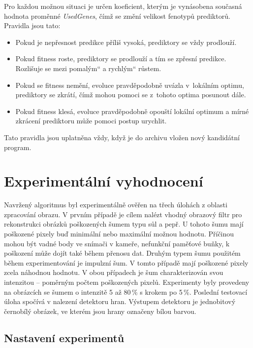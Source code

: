 \documentclass[fleqn,11pt]{ExcelAtFIT} %
\newcommand{\uv}[1]{\quotedblbase #1\textquotedblleft}
\begin{document}
Pro každou možnou situaci je určen koeficient, kterým je vynásobena současná hodnota proměnné \emph{UsedGenes}, čímž se změní velikost fenotypů prediktorů. Pravidla jsou tato:

\begin{itemize}
    \item Pokud je nepřesnost predikce příliš vysoká, prediktory se vždy prodlouží.
    \item Pokud fitness roste, prediktory se prodlouží a tím se zpřesní predikce. Rozlišuje se mezi \uv{pomalým} a \uv{rychlým} růstem.
    \item Pokud se fitness nemění, evoluce pravděpodobně uvázla v~lokálním optimu, prediktory se zkrátí, čímž mohou pomoci se z~tohoto optima posunout dále.
    \item Pokud fitness klesá, evoluce pravděpodobně opouští lokální optimum a mírné zkrácení prediktoru může pomoci postup urychlit.
\end{itemize}


Tato pravidla jsou uplatněna vždy, když je do archivu vložen nový kandidátní program.


\section{Experimentální vyhodnocení}
\label{sec:Experimental}

Navržený algoritmus byl experimentálně ověřen na třech úlohách z oblasti zpracování obrazu. V prvním případě je cílem nalézt vhodný obrazový filtr pro rekonstrukci obrázků poškozených šumem typu sůl a pepř. U tohoto šumu mají poškozené pixely buď minimální nebo maximální možnou hodnotu. Příčinou mohou být vadné body ve snímači v kameře, nefunkční paměťové buňky, k poškození může dojít také během přenosu dat. Druhým typem šumu použitém během experimentování je impulzní šum. V tomto případě mají poškozené pixely zcela náhodnou hodnotu. V obou případech je šum charakterizován svou intenzitou -- poměrným počtem poškozených pixelů. Experimenty byly provedeny na obrázcích se šumem o intenzitě 5 až 80\,\% s krokem po 5\,\%. Poslední testovací úloha spočívá v nalezení detektoru hran. Výstupem detektoru je jednobitový černobílý obrázek, ve kterém jsou hrany označeny bílou barvou.

\subsection{Nastavení experimentů}
\end{document}
